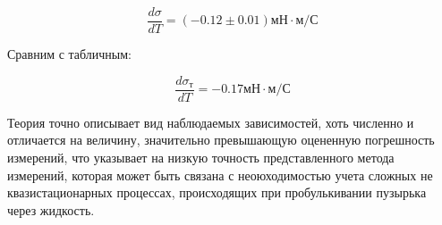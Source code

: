 \smallskip

\begin{equation*}
	\frac{d\sigma}{dT} = (-0.12 \pm 0.01) мН \cdot м / С
\end{equation*}

Сравним с табличным:

\begin{equation*}
	\frac{d\sigma_т}{dT} = -0.17 мН \cdot м / С
\end{equation*}

\bigskip

\begin{center}
\end{center}

Теория точно описывает вид наблюдаемых зависимостей, хоть численно и отличается на величину, значительно превышающую оцененную погрешность измерений, что указывает на низкую точность представленного метода измерений, которая может быть связана с неоюходимостью учета сложных не квазистационарных процессах, происходящих при пробулькивании пузырька через жидкость.


\newpage

\begin{center}
\end{center}

